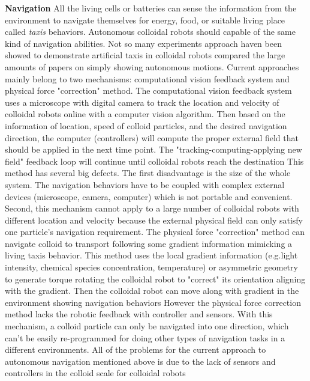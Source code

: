 \textbf{Navigation} All the living cells or batteries can sense the information from the environment to navigate themselves for energy, food, or suitable living place called \textit{taxis} behaviors. Autonomous colloidal robots should capable of the same kind of navigation abilities. Not so many experiments approach haven been showed to demonstrate  artificial taxis in colloidal robots compared the large amounts of papers on simply showing autonomous motions. Current approaches mainly belong to two mechanisms: computational vision feedback system and physical force "correction" method. The computational vision feedback system uses a microscope with digital camera to track the location and velocity of colloidal robots online with a computer vision algorithm. Then based on the information of location, speed of colloid particles, and the desired navigation direction, the computer (controllers) will compute the proper external field that should be applied in the next time point. The "tracking-computing-applying new field" feedback loop will continue until colloidal robots reach the destination\autocite{li2017autonomous,han2017sequence} This method has several big defects. The first disadvantage is the size of the whole system. The navigation behaviors have to be coupled with complex external devices (microscope, camera, computer) which is not portable and convenient. Second, this mechanism cannot apply to a large number of colloidal robots with different location and velocity because the external physical field can only satisfy one particle's navigation requirement. The physical force "correction" method can navigate  colloid to transport following  some gradient information mimicking a living taxis behavior. This method uses the local gradient information (e.g.light intensity, chemical species concentration, temperature) or asymmetric geometry to generate torque rotating  the colloidal robot to "correct" its orientation aligning with the gradient. Then the colloidal robot can move along with gradient in the environment showing navigation behaviors \autocite{brosseau2019relating,ten2014gravitaxis,lozano2016phototaxis,baker2019fight} However the physical force correction method  lacks the robotic feedback with controller and sensors. With this mechanism, a colloid particle can only be navigated into one direction, which can't be easily re-programmed for doing other types of navigation tasks in a different environments. All of the problems for the current approach to autonomous navigation mentioned above is due to the lack of sensors and controllers in the colloid scale for colloidal robots





